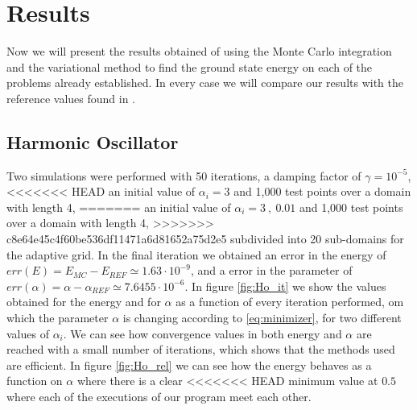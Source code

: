 
\section{Results}
Now we will present the results obtained of using the Monte Carlo integration and the variational
method to find the ground state energy on each of the problems already established. In every case
we will compare
our results with the reference values found in \cite{JosBook}.

\subsection{Harmonic Oscillator}
Two simulations were performed with 50 iterations, a damping factor of $\gamma = 10^{-5}$,
<<<<<<< HEAD
an initial value of $\alpha_i = 3$  and 1,000 test points over a domain with length 4,
=======
an initial value of $\alpha_i = 3~,~ 0.01$  and 1,000 test points over a domain with length 4,
>>>>>>> c8e64e45c4f60be536df11471a6d81652a75d2e5
subdivided into 20 sub-domains for the adaptive grid. In the final iteration we obtained an
error in the energy of $err(E)=E_{MC}-E_{REF}\simeq 1.63\cdot 10^{-9}$,
and a error in the parameter of $err(\alpha)=\alpha - \alpha_{REF} \simeq 7.6455\cdot 10^{-6}$. In figure \ref{fig:Ho_it}
we show the values obtained for the energy and for $\alpha$ as a function of every iteration performed,
om which the parameter $\alpha$ is changing according to \ref{eq:minimizer},
for two different values of $\alpha_i$. We can see how  convergence values in both energy and $\alpha$ are
reached with a small number of iterations, which shows that the methods used are efficient. In figure
 \ref{fig:Ho_rel} we can see how the energy behaves as a function on $\alpha$ where there is a clear
<<<<<<< HEAD
minimum value at $0.5$ where each of the executions of our program meet each other.
